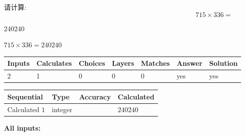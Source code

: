 \documentclass{ctexart}
\begin{document}
  
 
请计算:
\begin{equation}
715  \times    %
336 = \nonumber
\end{equation}
 
 
 
\noindent{}
 
 

240240
 
 
\noindent{}
 
 

 
 
 
\noindent{}
 
 

$ %
715 \times  %
336=   %
240240$
 
 
\noindent{}
 
 

 
   
   
   
   
\noindent\begin{tabular}{|l|l|l|l|l|l|l|}
 \hline
Inputs & Calculates & Choices & Layers & Matches & Answer & Solution \\ \hline
 2  & 
 1  & 
 0
  & 
 0  & 
 0  & 
  yes & 
  yes 
  \\ \hline
 \end{tabular}
   
   
   
   
\noindent{}
   
   
  
  
\noindent\begin{tabular}{|l|l|l|l|}
\hline
 Sequential & Type & Accuracy & Calculated \\ 
\hline
 
 
  Calculated $  1 $ & integer &  & 
  $ 240240 $ 
 \\  \hline  
 \end{tabular}
   
   
   
   
\noindent\vspace{0.1in}\hspace{-0.08in} {\textbf{\Large{All inputs: }}}
   
\end{document}
